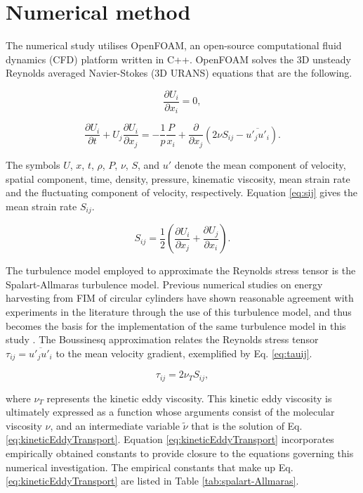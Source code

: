 \documentclass[oneside]{utmthesis}
\begin{document}
\section{Numerical method} \label{sec:numMeth}
The numerical study utilises OpenFOAM, an open-source computational fluid dynamics (CFD) platform written in C++. OpenFOAM solves the 3D unsteady Reynolds averaged Navier-Stokes (3D URANS) equations that are the following.

\begin{equation}
  \frac{\partial U_{i}}{\partial x_{i}}=0,
  \label{eq:continuity}
\end{equation}

\begin{equation}
  \frac{\partial U_{i}}{\partial t}+U_{j}\frac{\partial U_{i}}{\partial x_{j}} = -\frac{1}{p}\frac{P}{x_{i}}+\frac{\partial}{\partial x_{j}} \left( 2\nu S_{ij}-\overline{u'_{j}u'_{i}} \right).
  \label{eq:navier-stokes}
\end{equation}

The symbols $U$, $x$, $t$, $\rho$, $P$, $\nu$, $S$, and $u'$ denote the mean component of velocity, spatial component, time, density, pressure, kinematic viscosity, mean strain rate and the fluctuating component of velocity, respectively. Equation \ref{eq:sij} gives the mean strain rate $S_{ij}$.

\begin{equation}
  S_{ij} = \frac{1}{2} \left( \frac{\partial U_{i}}{\partial x_{j}} + \frac{\partial U_{j}}{\partial x_{i}} \right).
  \label{eq:sij}
\end{equation}

The turbulence model employed to approximate the Reynolds stress tensor is the Spalart-Allmaras turbulence model. Previous numerical studies on energy harvesting from FIM of circular cylinders have shown reasonable agreement with experiments in the literature through the use of this turbulence model, and thus becomes the basis for the implementation of the same turbulence model in this study \citep{Ding2015a,Ding2015b}. The Boussinesq approximation relates the Reynolds stress tensor $\tau_{ij} = \overline{u'_{j}u'_{i}}$ to the mean velocity gradient, exemplified by Eq. \ref{eq:tauij}.

\begin{equation}
  \tau_{ij} = 2 \nu_{T}S_{ij},
  \label{eq:tauij}
\end{equation}

\noindent where $\nu_{T}$ represents the kinetic eddy viscosity. This kinetic eddy viscosity is ultimately expressed as a function whose arguments consist of the molecular viscosity $\nu$, and an intermediate variable $\tilde{\nu}$ that is the solution of Eq. \ref{eq:kineticEddyTransport}. Equation \ref{eq:kineticEddyTransport} incorporates empirically obtained constants to provide closure to the equations governing this numerical investigation. The empirical constants that make up Eq. \ref{eq:kineticEddyTransport} are listed in Table \ref{tab:spalart-Allmaras}.
\end{document}
